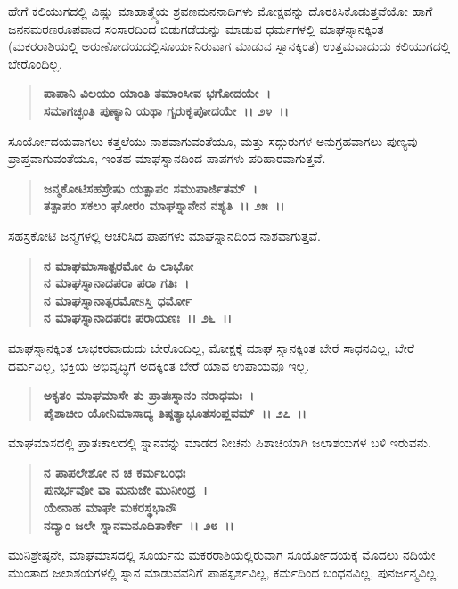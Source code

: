 ಹೇಗೆ ಕಲಿಯುಗದಲ್ಲಿ ವಿಷ್ಣು ಮಾಹಾತ್ಮ್ಯೆಯ ಶ್ರವಣಮನನಾದಿಗಳು ಮೋಕ್ಷವನ್ನು ದೊರಕಿಸಿಕೊಡುತ್ತವೆಯೋ ಹಾಗೆ ಜನನಮರಣರೂಪವಾದ ಸಂಸಾರದಿಂದ ಬಿಡುಗಡೆಯನ್ನು ಮಾಡುವ ಧರ್ಮಗಳಲ್ಲಿ ಮಾಘಸ್ನಾನಕ್ಕಿಂತ (ಮಕರರಾಶಿಯಲ್ಲಿ ಅರುಣೋದಯದಲ್ಲಿ\break ಸೂರ್ಯನಿರುವಾಗ ಮಾಡುವ ಸ್ನಾನಕ್ಕಿಂತ) ಉತ್ತಮವಾದುದು ಕಲಿಯುಗದಲ್ಲಿ ಬೇರೊಂದಿಲ್ಲ.

\begin{verse}
\textbf{ಪಾಪಾನಿ ವಿಲಯಂ ಯಾಂತಿ ತಮಾಂಸೀವ ಭಗೋದಯೇ~।}\\\textbf{ಸಮಾಗಚ್ಛಂತಿ ಪುಣ್ಯಾನಿ ಯಥಾ ಗೃರುಕೃಪೋದಯೇ~।। ೨೪~।।}
\end{verse}

ಸೂರ್ಯೋದಯವಾಗಲು ಕತ್ತಲೆಯು ನಾಶವಾಗುವಂತೆಯೂ, ಮತ್ತು ಸದ್ಗುರುಗಳ ಅನುಗ್ರಹವಾಗಲು ಪುಣ್ಯವು ಪ್ರಾಪ್ತವಾಗುವಂತೆಯೂ, ಇಂತಹ ಮಾಘಸ್ನಾನದಿಂದ ಪಾಪಗಳು ಪರಿಹಾರವಾಗುತ್ತವೆ.

\begin{verse}
\textbf{ಜನ್ಮಕೋಟಿಸಹಸ್ರೇಷು ಯತ್ಪಾಪಂ ಸಮುಪಾರ್ಜಿತಮ್~।}\\\textbf{ತತ್ಪಾಪಂ ಸಕಲಂ ಘೋರಂ ಮಾಘಸ್ನಾನೇನ ನಶ್ಯತಿ~।। ೨೫~।।}
\end{verse}

ಸಹಸ್ರಕೋಟಿ ಜನ್ಮಗಳಲ್ಲಿ ಆಚರಿಸಿದ ಪಾಪಗಳು ಮಾಘಸ್ನಾನದಿಂದ ನಾಶವಾಗುತ್ತವೆ.

\begin{verse}
\textbf{ನ ಮಾಘಮಾಸಾತ್ಪರಮೋ ಹಿ ಲಾಭೋ}\\\textbf{ನ ಮಾಘಸ್ನಾನಾದಪರಾ ಪರಾ ಗತಿಃ~।}\\\textbf{ನ ಮಾಘಸ್ನಾನಾತ್ಪರಮೋsಸ್ತಿ ಧರ್ಮೋ}\\\textbf{ನ ಮಾಘಸ್ನಾನಾದಪರಃ ಪರಾಯಣಃ~।। ೨೬~।।}
\end{verse}

ಮಾಘಸ್ನಾನಕ್ಕಿಂತ ಲಾಭಕರವಾದುದು ಬೇರೊಂದಿಲ್ಲ, ಮೋಕ್ಷಕ್ಕೆ ಮಾಘ ಸ್ನಾನಕ್ಕಿಂತ ಬೇರೆ ಸಾಧನವಿಲ್ಲ, ಬೇರೆ ಧರ್ಮವಿಲ್ಲ, ಭಕ್ತಿಯ ಅಭಿವೃದ್ಧಿಗೆ ಅದಕ್ಕಿಂತ ಬೇರೆ ಯಾವ ಉಪಾಯವೂ ಇಲ್ಲ.

\begin{verse}
\textbf{ಅಕೃತಂ ಮಾಘಮಾಸೇ ತು ಪ್ರಾತಃಸ್ನಾನಂ ನರಾಧಮಃ~।}\\\textbf{ಪೈಶಾಚೀಂ ಯೋನಿಮಾಸಾದ್ಯ ತಿಷ್ಠತ್ಯಾಭೂತಸಂಪ್ಲವಮ್~।। ೨೭~।।}
\end{verse}

ಮಾಘಮಾಸದಲ್ಲಿ ಪ್ರಾತಃಕಾಲದಲ್ಲಿ ಸ್ನಾನವನ್ನು ಮಾಡದ ನೀಚನು ಪಿಶಾಚಿಯಾಗಿ ಜಲಾಶಯಗಳ ಬಳಿ ಇರುವನು.

\begin{verse}
\textbf{ನ ಪಾಪಲೇಶೋ ನ ಚ ಕರ್ಮಬಂಧಃ}\\\textbf{ಪುನರ್ಭವೋ ವಾ ಮನುಜೇ ಮುನೀಂದ್ರ~।}\\\textbf{ಯೇನಾಹ ಮಾಘೇ ಮಕರಸ್ಥಭಾನೌ} \\\textbf{ನದ್ಯಾಂ ಜಲೇ ಸ್ನಾನಮನೂದಿತಾರ್ಕೇ~।। ೨೮~।।}
\end{verse}

ಮುನಿಶ್ರೇಷ್ಠನೇ, ಮಾಘಮಾಸದಲ್ಲಿ ಸೂರ್ಯನು ಮಕರರಾಶಿಯಲ್ಲಿರುವಾಗ ಸೂರ್ಯೋದಯಕ್ಕೆ ಮೊದಲು ನದಿಯೇ ಮುಂತಾದ ಜಲಾಶಯಗಳಲ್ಲಿ ಸ್ನಾನ ಮಾಡುವವನಿಗೆ ಪಾಪಸ್ಪರ್ಶವಿಲ್ಲ, ಕರ್ಮದಿಂದ ಬಂಧನವಿಲ್ಲ, ಪುನರ್ಜನ್ಮವಿಲ್ಲ.

